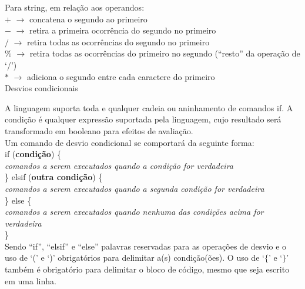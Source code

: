\documentclass[12pt,a4paper]{article}
\def\emph#1{\textbf{#1}} %
\begin{document}
Para string, em relação aos operandos:\\[0.2cm]
$+$ $\rightarrow$ concatena o segundo ao primeiro\\
$-$ $\rightarrow$ retira a primeira ocorrência do segundo no primeiro\\
$/$ $\rightarrow$ retira todas as ocorrências do segundo no primeiro\\
\% $\rightarrow$ retira todas as ocorrências do primeiro no segundo (``resto'' da operação de `/')\\
$*$ $\rightarrow$ adiciona o segundo entre cada caractere do primeiro\\

\hypertarget{label4}{\Large{Desvios condicionais}}\\[0.3cm]
\normalsize

A linguagem suporta toda e qualquer cadeia ou aninhamento de comandos if. A condição é qualquer expressão suportada pela linguagem, cujo resultado será transformado em booleano para efeitos de avaliação.\\

Um comando de desvio condicional se comportará da seguinte forma: \\
if (\emph{condição}) \{ \\

\textit{comandos a serem executados quando a condição for verdadeira} \\

\} elsif (\emph{outra condição}) \{\\

\textit{comandos a serem executados quando a segunda condição for verdadeira} \\

\} else \{\\


\textit{comandos a serem executados quando nenhuma das condições acima for verdadeira} \\

\}\\


Sendo ``if'', ``elsif'' e ``else'' palavras reservadas para as operações de desvio e o uso de `(' e `)' obrigatórios para delimitar a(s) condição(ões). O uso de `$\{$' e `$\}$' também é obrigatório para delimitar o bloco de código, mesmo que seja escrito em uma linha.\\
\end{document}
